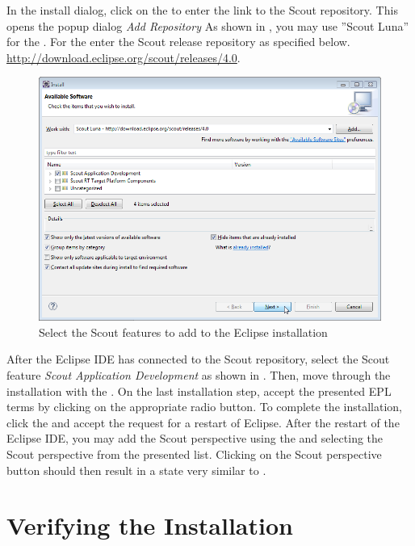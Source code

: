 \documentclass[a4paper,10pt,twoside]{book}
\begin{document}
In the install dialog, click on the  to enter the link to the Scout repository.
This opens the popup dialog \textit{Add Repository}
As shown in , you may use ''Scout Luna'' for the .
For the  enter the Scout release repository as specified below.
\url{http://download.eclipse.org/scout/releases/4.0}.

\begin{figure}
\includegraphics[width=13cm]{eclipse_select_scout_features.png}
\caption{Select the Scout features to add to the Eclipse installation}
\end{figure}

After the Eclipse IDE has connected to the Scout repository, select the Scout feature \textit{Scout Application Development} as shown in .
Then, move through the installation with the .
On the last installation step, accept the presented EPL terms by clicking on the appropriate radio button. 
To complete the installation, click the  and accept the request for a restart of Eclipse.
After the restart of the Eclipse IDE, you may add the Scout perspective using the  and selecting the Scout perspective from the presented list. 
Clicking on the Scout perspective button should then result in a state very similar to .

\section{Verifying the Installation}
\end{document}
